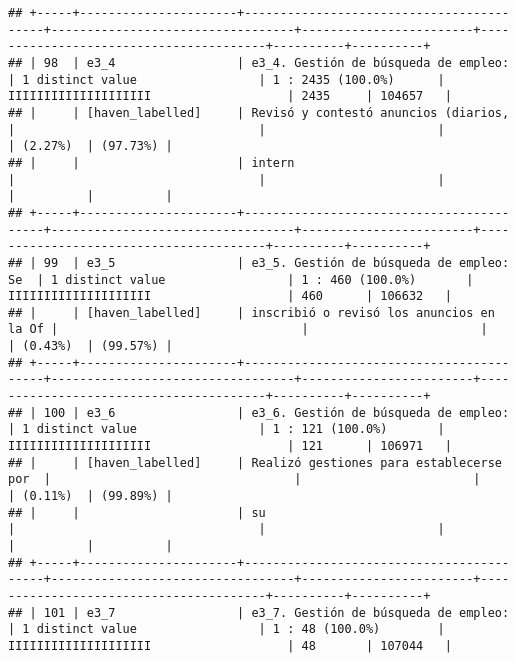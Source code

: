 \documentclass[]{article}
\begin{document}
\begin{verbatim}
## +-----+----------------------+------------------------------------------+----------------------------------+------------------------+----------------------------------------+----------+----------+
## | 98  | e3_4                 | e3_4. Gestión de búsqueda de empleo:     | 1 distinct value                 | 1 : 2435 (100.0%)      | IIIIIIIIIIIIIIIIIIII                   | 2435     | 104657   |
## |     | [haven_labelled]     | Revisó y contestó anuncios (diarios,     |                                  |                        |                                        | (2.27%)  | (97.73%) |
## |     |                      | intern                                   |                                  |                        |                                        |          |          |
## +-----+----------------------+------------------------------------------+----------------------------------+------------------------+----------------------------------------+----------+----------+
## | 99  | e3_5                 | e3_5. Gestión de búsqueda de empleo: Se  | 1 distinct value                 | 1 : 460 (100.0%)       | IIIIIIIIIIIIIIIIIIII                   | 460      | 106632   |
## |     | [haven_labelled]     | inscribió o revisó los anuncios en la Of |                                  |                        |                                        | (0.43%)  | (99.57%) |
## +-----+----------------------+------------------------------------------+----------------------------------+------------------------+----------------------------------------+----------+----------+
## | 100 | e3_6                 | e3_6. Gestión de búsqueda de empleo:     | 1 distinct value                 | 1 : 121 (100.0%)       | IIIIIIIIIIIIIIIIIIII                   | 121      | 106971   |
## |     | [haven_labelled]     | Realizó gestiones para establecerse por  |                                  |                        |                                        | (0.11%)  | (99.89%) |
## |     |                      | su                                       |                                  |                        |                                        |          |          |
## +-----+----------------------+------------------------------------------+----------------------------------+------------------------+----------------------------------------+----------+----------+
## | 101 | e3_7                 | e3_7. Gestión de búsqueda de empleo:     | 1 distinct value                 | 1 : 48 (100.0%)        | IIIIIIIIIIIIIIIIIIII                   | 48       | 107044   |

\end{verbatim}
\end{document}
